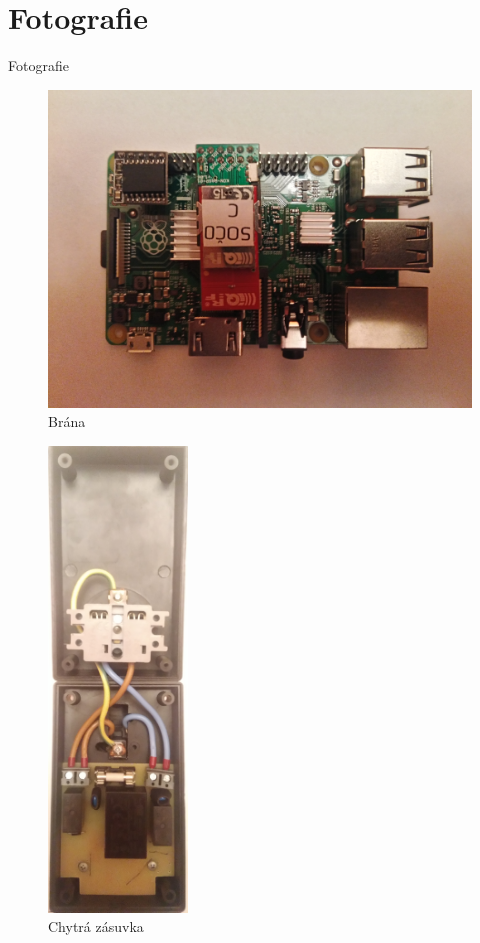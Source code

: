 \documentclass[11pt]{beamer}
\begin{document}
\section{Fotografie}

\begin{frame}{Fotografie}
  \begin{center}
      \begin{figure}
        \includegraphics[width = \textwidth]{../img/foto/brana.jpg}
        \caption{Brána}
      \end{figure}
    \endminipage
      \begin{figure}
        \includegraphics[width = 0.33\textwidth]{../img/foto/zasuvka.jpg}
        \caption{Chytrá zásuvka}
      \end{figure}
    \endminipage
  \end{center}
\end{frame}
\end{document}
